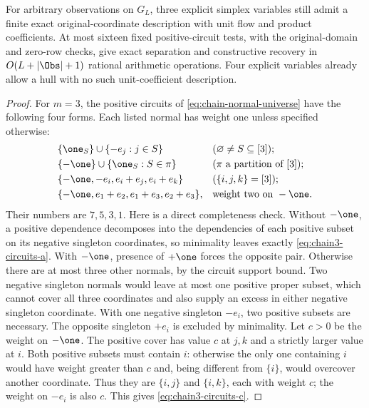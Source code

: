 \begin{theorem}\label{thm:three-state-chain}
For arbitrary observations on $G_L$, three explicit simplex variables
still admit a finite exact original-coordinate description with unit
flow and product coefficients. At most sixteen fixed positive-circuit tests,
with the original-domain and zero-row checks, give exact separation
and constructive recovery in $O(L+|\Obs|+1)$ rational arithmetic
operations. Four explicit variables already allow a hull with no
such unit-coefficient description.
\end{theorem}
\begin{proof}
For $m=3$, the positive circuits of \eqref{eq:chain-normal-universe}
have the following four forms. Each listed normal has weight one
unless specified otherwise:
\begin{align}
 &\{\one_S\}\cup\{-e_j:j\in S\}
       &&(\varnothing\ne S\subseteq[3]);\label{eq:chain3-circuits-a}\\
 &\{-\one\}\cup\{\one_S:S\in\pi\}
       &&(\pi\text{ a partition of }[3]);\label{eq:chain3-circuits-b}\\
 &\{-\one,-e_i,e_i+e_j,e_i+e_k\}
       &&(\{i,j,k\}=[3]);\label{eq:chain3-circuits-c}\\
 &\{-\one,e_1+e_2,e_1+e_3,e_2+e_3\},
       &&\text{weight two on }-\one.\label{eq:chain3-circuits-d}
\end{align}
Their numbers are $7,5,3,1$. Here is a direct completeness check.
Without $-\one$, a positive dependence decomposes into the
dependencies of each positive subset on its negative singleton
coordinates, so minimality leaves exactly
\eqref{eq:chain3-circuits-a}. With $-\one$, presence of $+\one$
forces the opposite pair. Otherwise there are at most three other
normals, by the circuit support bound. Two negative singleton
normals would leave at most one positive proper subset, which
cannot cover all three coordinates and also supply an excess in
either negative singleton coordinate. With one negative singleton
$-e_i$, two positive subsets are necessary. The opposite singleton
$+e_i$ is excluded by minimality. Let $c>0$ be the weight on
$-\one$. The positive cover has value $c$ at $j,k$ and a strictly
larger value at $i$. Both positive subsets must contain $i$: otherwise
the only one containing $i$ would have weight greater than $c$ and,
being different from $\{i\}$, would overcover another coordinate.
Thus they are $\{i,j\}$ and $\{i,k\}$, each with weight $c$;
the weight on $-e_i$ is also $c$. This gives
\eqref{eq:chain3-circuits-c}.


\end{proof}

